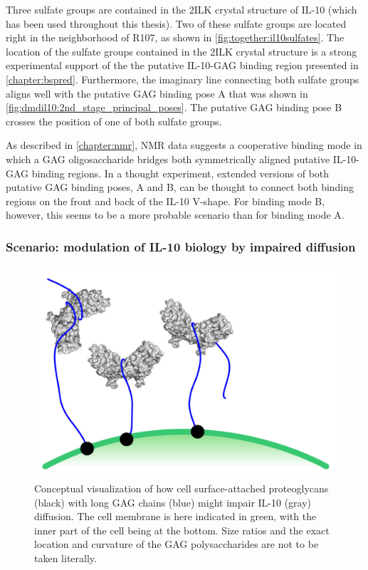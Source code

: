 Three sulfate groups are contained in the 2ILK crystal structure of IL-10 (which
has been used throughout this thesis). Two of these sulfate groups are located
right in the neighborhood of R107, as shown in \cref{fig:together:il10sulfates}.
The location of the sulfate groups contained in the 2ILK crystal structure is a
strong experimental support of the the putative IL-10-GAG binding region
presented in \cref{chapter:bspred}. Furthermore, the imaginary line connecting
both sulfate groups aligns well with the putative GAG binding pose A that was
shown in \cref{fig:dmdil10:2nd_stage_principal_poses}. The putative GAG binding
pose B crosses the position of one of both sulfate groups.

As described in \cref{chapter:nmr}, NMR data suggests a cooperative binding mode
in which a GAG oligosaccharide bridges both symmetrically aligned putative
IL-10-GAG binding regions. In a thought experiment, extended versions of both
putative GAG binding poses, A and B, can be thought to connect both binding
regions on the front and back of the IL-10 V-shape. For binding mode B, however,
this seems to be a more probable scenario than for binding mode A.


\subsubsection{Scenario: modulation of IL-10 biology by impaired diffusion}

\begin{figure}
\centering
\includegraphics[width=1.0\textwidth]{gfx/together/agglomeration_small.jpg}
\caption[]{
Conceptual visualization of how cell surface-attached proteoglycans (black) with
long GAG chains (blue) might impair IL-10 (gray) diffusion. The cell membrane is
here indicated in green, with the inner part of the cell being at the bottom.
Size ratios and the exact location and curvature of the GAG polysaccharides are
not to be taken literally.}
\label{fig:together:diffusionimpaired}
\end{figure}

